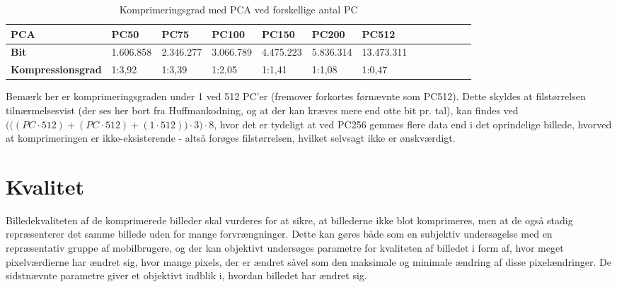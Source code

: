 \begin{table}[htbp]
\centering
\begin{tabular}{|l|l|l|l|l|l|l|l|l|l|l|l|l|}	\hline
\textbf{PCA}					& \textbf{PC50}  		& \textbf{PC75}   		& \textbf{PC100}  		& \textbf{PC150}	& \textbf{PC200}			& \textbf{PC512}   		\\ \hline
\textbf{Bit	}				& 1.606.858		& 2.346.277		& 3.066.789
&4.475.223 	& 5.836.314		& 13.473.311 	\\ \hline
\textbf{Kompressionsgrad}		& 1:3,92			& 1:3,39			& 1:2,05	 & 1:1,41		& 1:1,08		& 1:0,47		\\ \hline
\end{tabular}
\caption{Komprimeringsgrad med PCA ved forskellige antal PC}
\label{tb:komprimering_PCA2}
\end{table}

Bemærk her er komprimeringsgraden under 1 ved 512 PC'er (fremover forkortes førnævnte som PC512). Dette skyldes at filstørrelsen tilnærmelsesvist (der ses her bort fra Huffmankodning, og at der kan kræves mere end otte bit pr. tal), kan findes ved $\Big(\big((PC \cdot 512) + (PC \cdot 512) + (1 \cdot 512)\big) \cdot 3 \Big) \cdot 8$, hvor det er tydeligt at ved PC256 gemmes flere data end i det oprindelige billede, hvorved at komprimeringen er ikke-eksisterende - altså forøges filstørrelsen, hvilket selvsagt ikke er ønskværdigt.

\section{Kvalitet}
Billedekvaliteten af de komprimerede billeder skal vurderes for at sikre, at billederne ikke blot komprimeres, men at de også stadig repræsenterer det samme billede uden for mange forvrængninger. Dette kan gøres både som en subjektiv undersøgelse med en repræsentativ gruppe af mobilbrugere, og der kan objektivt undersøges parametre for kvaliteten af billedet i form af, hvor meget pixelværdierne har ændret sig, hvor mange pixels, der er ændret såvel som den maksimale og minimale ændring af disse pixelændringer. De sidstnævnte parametre giver et objektivt indblik i, hvordan billedet har ændret sig.

